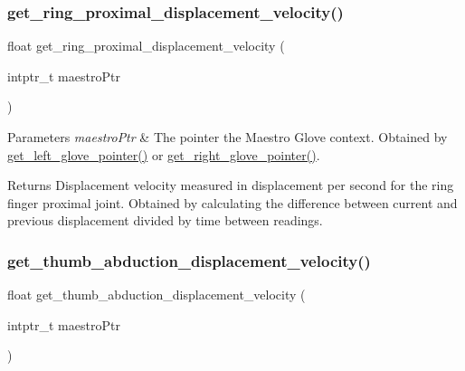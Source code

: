 \subsubsection{\texorpdfstring{get\+\_\+ring\+\_\+proximal\+\_\+displacement\+\_\+velocity()}{get\_ring\_proximal\_displacement\_velocity()}}
{\footnotesize\ttfamily float get\+\_\+ring\+\_\+proximal\+\_\+displacement\+\_\+velocity (\begin{DoxyParamCaption}\item[{intptr\+\_\+t}]{maestro\+Ptr }\end{DoxyParamCaption})}


\begin{DoxyParams}{Parameters}
{\em maestro\+Ptr} & The pointer the Maestro Glove context. Obtained by \hyperlink{group__glove_management_ga63ce3c99d4a8b8db851b22af9185764e}{get\+\_\+left\+\_\+glove\+\_\+pointer()} or \hyperlink{group__glove_management_ga9b8fd9d91aeac3f8da50f7a7eba0c32b}{get\+\_\+right\+\_\+glove\+\_\+pointer()}. \\
\hline
\end{DoxyParams}
\begin{DoxyReturn}{Returns}
Displacement velocity measured in displacement per second for the ring finger proximal joint. Obtained by calculating the difference between current and previous displacement divided by time between readings. 
\end{DoxyReturn}
\mbox{\label{group__velocity_access_gad35bee8dbf90f9f0106fd9f5c6efac2c}} 
\subsubsection{\texorpdfstring{get\+\_\+thumb\+\_\+abduction\+\_\+displacement\+\_\+velocity()}{get\_thumb\_abduction\_displacement\_velocity()}}
{\footnotesize\ttfamily float get\+\_\+thumb\+\_\+abduction\+\_\+displacement\+\_\+velocity (\begin{DoxyParamCaption}\item[{intptr\+\_\+t}]{maestro\+Ptr }\end{DoxyParamCaption})}


